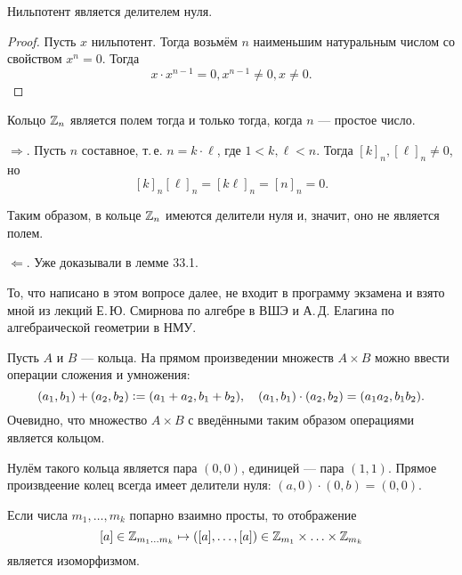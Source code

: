 \begin{lemma}
    Нильпотент является делителем нуля.
\end{lemma}

\begin{proof}
    Пусть $x$ нильпотент. Тогда возьмём $n$ наименьшим натуральным числом со свойством $x^n = 0$. Тогда
    $$
    x \cdot x^{n - 1} = 0, x^{n - 1} \ne 0, x \ne 0.
    $$
\end{proof}

\begin{theorem}
    Кольцо $\mathbb{Z}_n$ является полем тогда и только тогда, когда $n$ --- простое число.
\end{theorem}

\begin{theorem}
    $\Rightarrow$. Пусть $n$ составное, т.\,е. $n = k \cdot \ell$, где $1 < k, \ell < n$. Тогда $[k]_n, [\ell]_n \ne 0$, но
    $$
    [k]_n[\ell]_n = [k\ell]_n = [n]_n = 0.
    $$

    Таким образом, в кольце $\mathbb{Z}_n$ имеются делители нуля и, значит, оно не является полем.

    $\Leftarrow$. Уже доказывали в лемме 33.1.
\end{theorem}

\begin{remark}
    То, что написано в этом вопросе далее, не входит в программу экзамена и взято мной из лекций Е.\,Ю. Смирнова по алгебре в ВШЭ и А.\,Д. Елагина по алгебраической геометрии в НМУ.
\end{remark}

\begin{definition}
    Пусть $A$ и $B$ --- кольца. На прямом произведении множеств $A \times B$ можно ввести операции сложения и умножения:
    $$
    (a_1, b_1) + (a_2, b_2) \vcentcolon = (a_1 + a_2, b_1 + b_2),\quad (a_1, b_1) \cdot (a_2, b_2) = (a_1a_2, b_1b_2).
    $$
    Очевидно, что множество $A \times B$ с введёнными таким образом операциями является кольцом.
\end{definition}

\begin{remark}
    Нулём такого кольца является пара $(0, 0)$, единицей --- пара $(1, 1)$. Прямое произвдеение колец всегда имеет делители нуля: $(a, 0) \cdot (0, b) = (0, 0)$.
\end{remark}

\begin{theorem}
    Если числа $m_1, \ldots, m_k$ попарно взаимно просты, то отображение 
    $$
    [a] \in \mathbb{Z}_{m_1\ldots m_k} \mapsto ([a], \ldots, [a]) \in \mathbb{Z}_{m_1} \times \ldots \times \mathbb{Z}_{m_k}
    $$
    является изоморфизмом.
\end{theorem}

